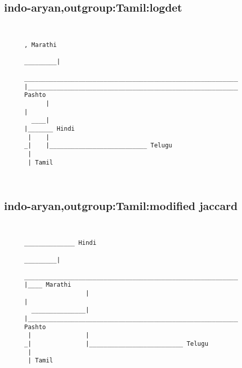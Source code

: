 \subsection{indo-aryan,outgroup:Tamil:logdet}
\begin{figure}[H]
\begin{center}
{
\selectfont
\begin{verbatim}

                                                                                      , Marathi
                                                                             _________|
       _____________________________________________________________________|         |_______________________________________________________________ Pashto
      |                                                                     |
  ____|                                                                     |_______ Hindi
 |    |
_|    |___________________________ Telugu
 |
 | Tamil



\end{verbatim}
}
\label{...}
\end{center}
\end{figure}
\subsection{indo-aryan,outgroup:Tamil:modified jaccard}
\begin{figure}[H]
\begin{center}
{
\selectfont
\begin{verbatim}

                                                                                            ______________ Hindi
                                                                                  _________|
                  _______________________________________________________________|         |____ Marathi
                 |                                                               |
  _______________|                                                               |____________________________________________________________________ Pashto
 |               |
_|               |__________________________ Telugu
 |
 | Tamil



\end{verbatim}
}
\label{...}
\end{center}
\end{figure}
